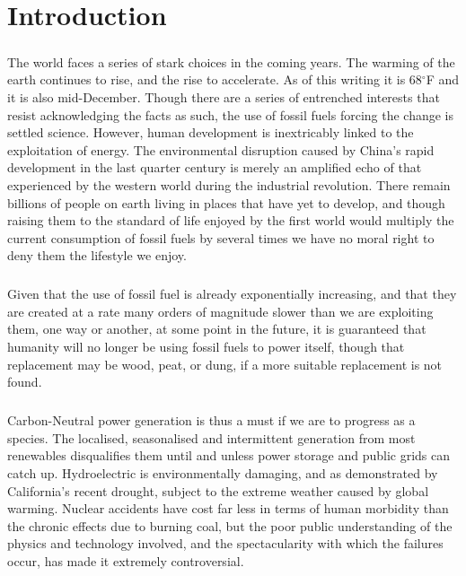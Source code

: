\chapter{Introduction}
\paragraph{} The world faces a series of stark choices in the coming years.  The warming of the earth continues to rise, and the rise to accelerate.  As of this writing it is 68$^{\circ}$F and it is also mid-December.  Though there are a series of entrenched interests that resist acknowledging the facts as such, the use of fossil fuels forcing the change is settled science.  However, human development is inextricably linked to the exploitation of energy.  The environmental disruption caused by China's rapid development in the last quarter century is merely an amplified echo of that experienced by the western world during the industrial revolution.  There remain billions of people on earth living in places that have yet to develop, and though raising them to the standard of life enjoyed by the first world would multiply the current consumption of fossil fuels by several times we have no moral right to deny them the lifestyle we enjoy.  
\paragraph{}
Given that the use of fossil fuel is already exponentially increasing, and that they are created at a rate many orders of magnitude slower than we are exploiting them, one way or another, at some point in the future, it is guaranteed that humanity will no longer be using fossil fuels to power itself, though that replacement may be wood, peat, or dung, if a more suitable replacement is not found.
\paragraph{}
Carbon-Neutral power generation is thus a must if we are to progress as a species.  The localised, seasonalised and intermittent generation from most renewables disqualifies them until and unless power storage and public grids can catch up.  Hydroelectric is environmentally damaging, and as demonstrated by California's recent drought, subject to the extreme weather caused by global warming.  Nuclear accidents have cost far less in terms of human morbidity than the chronic effects due to burning coal, but the poor public understanding of the physics and technology involved, and the spectacularity with which the failures occur, has made it extremely controversial.
